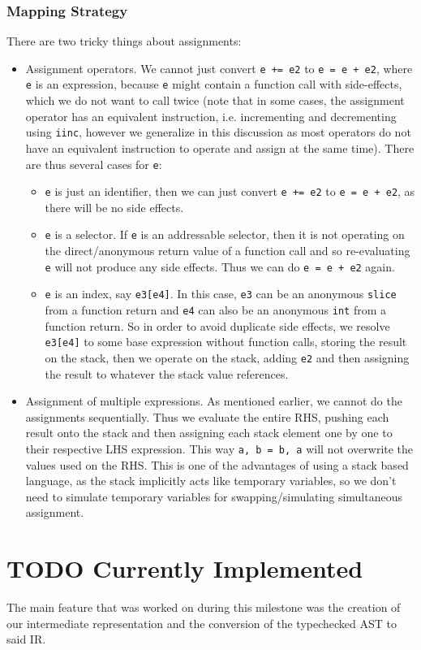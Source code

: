 \documentclass[11pt]{article}
\begin{document}
\subsubsection{Mapping Strategy}
\label{sec:org5ebc4b3}
There are two tricky things about assignments:
\begin{itemize}
\item Assignment operators. We cannot just convert \texttt{e += e2} to \texttt{e =
      e + e2}, where \texttt{e} is an expression, because \texttt{e} might contain a
function call with side-effects, which we do not want to call
twice (note that in some cases, the assignment operator has an
equivalent instruction, i.e. incrementing and decrementing using
\texttt{iinc}, however we generalize in this discussion as most
operators do not have an equivalent instruction to operate and
assign at the same time). There are thus several cases for \texttt{e}:
\begin{itemize}
\item \texttt{e} is just an identifier, then we can just convert \texttt{e += e2}
to \texttt{e = e + e2}, as there will be no side effects.
\item \texttt{e} is a selector. If \texttt{e} is an addressable selector, then it
is not operating on the direct/anonymous return value of a
function call and so re-evaluating \texttt{e} will not produce any
side effects. Thus we can do \texttt{e = e + e2} again.
\item \texttt{e} is an index, say \texttt{e3[e4]}. In this case, \texttt{e3} can be an
anonymous \texttt{slice} from a function return and \texttt{e4} can also be an
anonymous \texttt{int} from a function return. So in order to avoid
duplicate side effects, we resolve \texttt{e3[e4]} to some base
expression without function calls, storing the result on the
stack, then we operate on the stack, adding \texttt{e2} and then
assigning the result to whatever the stack value references.
\end{itemize}
\item Assignment of multiple expressions. As mentioned earlier, we
cannot do the assignments sequentially. Thus we evaluate the
entire RHS, pushing each result onto the stack and then
assigning each stack element one by one to their respective LHS
expression. This way \texttt{a, b = b, a} will not overwrite the values
used on the RHS. This is one of the advantages of using a stack
based language, as the stack implicitly acts like temporary
variables, so we don't need to simulate temporary variables for
swapping/simulating simultaneous assignment.
\end{itemize}
\section{{\bfseries\sffamily TODO} Currently Implemented}
\label{sec:org210ef85}
The main feature that was worked on during this milestone was the
creation of our intermediate representation and the conversion of
the typechecked AST to said IR.
\end{document}
